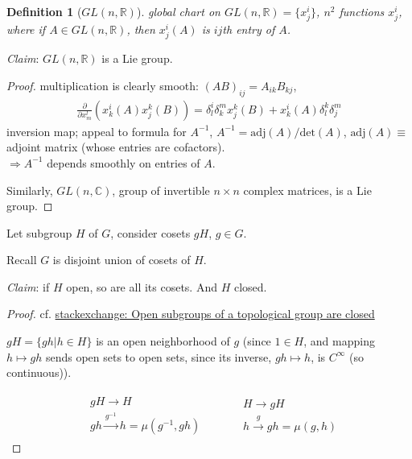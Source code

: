 \documentclass[10pt]{amsart}
\newtheorem{definition}{Definition}
\newcommand{\exercisehead}[1]
  { \smallskip
   \noindent{\small\bf Exercise #1.}
  }
\begin{document}
\begin{multicols*}{2}
\begin{definition}[$GL(n, \mathbb{R})$]
	global chart on $GL(n, \mathbb{R}) = \lbrace x^i_j \rbrace$, $n^2$ functions $x^i_j$, where if $A \in GL(n,\mathbb{R})$, then $x^i_j(A)$ is $ij$th entry of $A$. 
\end{definition}

\emph{Claim}: $GL(n,\mathbb{R})$ is a Lie group. 

\begin{proof}
multiplication is clearly smooth: $(AB)_{ij} = A_{ik}B_{kj}$, 
\[
\begin{gathered}
	\frac{ \partial }{ \partial x^l_m} (x^i_k(A) x^k_j(B)) = \delta^i_l \delta^m_k x^k_j(B) + x^i_k(A)\delta^k_l \delta^m_j
\end{gathered}
\]
inversion map; appeal to formula for $A^{-1}$, $A^{-1} = \text{adj}(A) / \text{det}(A)$, $\text{adj}(A) \equiv$ adjoint matrix (whose entries are cofactors). \\
$\Longrightarrow A^{-1}$ depends smoothly on entries of $A$.

Similarly, $GL(n,\mathbb{C})$, group of invertible $n\times n$ complex matrices, is a Lie group.
\end{proof}

\exercisehead{5.5}\label{Ex:5.5SubgroupIsOpenAndClosed} Let subgroup $H$ of $G$, consider cosets $gH$, $g\in G$.

Recall $G$ is disjoint union of cosets of $H$.

\emph{Claim}: if $H$ open, so are all its cosets. And $H$ closed.

\begin{proof}
	cf. \href{https://math.stackexchange.com/questions/226847/open-subgroups-of-a-topological-group-are-closed}{stackexchange: Open subgroups of a topological group are closed}
	
	$gH = \lbrace gh | h \in H \rbrace$ is an open neighborhood of $g$ (since $1 \in H$, and mapping $h \mapsto gh$ sends open sets to open sets, since its inverse, $gh \mapsto h$, is $C^{\infty}$ (so continuous)).
	
	\[
	\begin{gathered}
	\begin{aligned}
	& gH \to H \\
	& gh \xrightarrow{g^{-1}} h = \mu(g^{-1}, gh)
	\end{aligned} \qquad \, 
	\begin{aligned}
	& H \to gH \\
	& h \xrightarrow{g} gh = \mu(g, h) 
	\end{aligned}
	\end{gathered}
	\]
	

\end{proof}
\end{multicols*}
\end{document}
